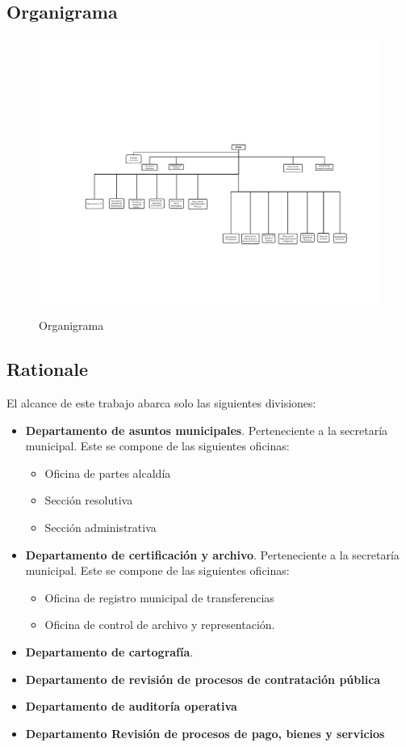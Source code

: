
\subsection{Organigrama}

\begin{figure}[H]
	\centering
	\includegraphics[width=1\textwidth]{fragments/01structure/organigramaMunicipalidad.pdf}\\
\caption{Organigrama}
\label{FIG:ORGANIGRAMA}
\end{figure}


\subsection{Rationale}
El alcance de este trabajo abarca solo las siguientes divisiones:
\begin{itemize}
	\item {
		\textbf{Departamento de asuntos municipales}. Perteneciente a la secretaría municipal. Este se compone de las siguientes oficinas:
		\begin{itemize}
			\item Oficina de partes alcaldía
			\item Sección resolutiva
			\item Sección administrativa
		\end{itemize}
	}
	\item {
		\textbf{Departamento de certificación y archivo}.  Perteneciente a la secretaría municipal. Este se compone de las siguientes oficinas:
		\begin{itemize}
			\item Oficina de registro municipal de transferencias
			\item Oficina de control de archivo y representación.
		\end{itemize}
	}
	\item {
		\textbf{Departamento de cartografía}.
	}
	\item {
		\textbf{Departamento de revisión de procesos de contratación pública}
	}
	\item {
		\textbf{Departamento de auditoría operativa}
	}
	\item {
		\textbf{Departamento Revisión de procesos de pago, bienes y servicios}
	}
\end{itemize}

